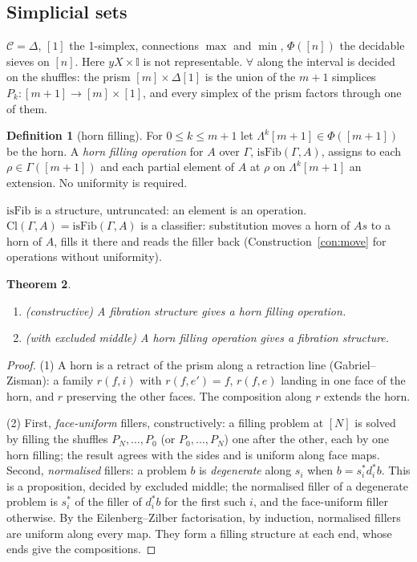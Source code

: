 \documentclass[11pt]{article}
\newcommand{\I}{\mathbb{I}}
\newcommand{\C}{\mathcal{C}}
\newcommand{\Cl}{\mathrm{Cl}}
\newcommand{\isFib}{\mathrm{isFib}}
\newcommand{\Lam}{\Lambda}
\theoremstyle{plain}
\newtheorem{theorem}{Theorem}[section]
\theoremstyle{definition}
\newtheorem{definition}[theorem]{Definition}
\theoremstyle{remark}
\begin{document}
\subsection{Simplicial sets}\label{sec:delta}

$\C=\Delta$, $[1]$ the 1-simplex, connections $\max$ and $\min$, $\Phi([n])$
the decidable sieves on $[n]$. Here $yX\times\I$ is not representable.
$\forall$ along the interval is decided on the shuffles: the prism
$[m]\times\Delta[1]$ is the union of the $m+1$ simplices
$P_k:[m+1]\to[m]\times[1]$, and every simplex of the prism factors
through one of them.

\begin{definition}[horn filling]
For $0\le k\le m+1$ let $\Lam^k[m+1]\in\Phi([m+1])$ be the horn. A
\emph{horn filling operation} for $A$ over $\Gamma$, $\isFib(\Gamma,A)$,
assigns to each $\rho\in\Gamma([m+1])$ and each partial element of $A$ at
$\rho$ on $\Lam^k[m+1]$ an extension. No uniformity is required.
\end{definition}

$\isFib$ is a structure, untruncated: an element is an operation.
$\Cl(\Gamma,A)=\isFib(\Gamma,A)$ is a classifier: substitution moves a
horn of $As$ to a horn of $A$, fills it there and reads the filler back
(Construction~\ref{con:move} for operations without uniformity).

\begin{theorem}\label{thm:hornbox}
\leavevmode
\begin{enumerate}
\item (constructive) A fibration structure gives a horn filling
  operation.
\item (with excluded middle) A horn filling operation gives a fibration
  structure.
\end{enumerate}
\end{theorem}

\begin{proof}
(1) A horn is a retract of the prism along a retraction line
(Gabriel--Zisman): a family $r(f,i)$ with $r(f,e')=f$, $r(f,e)$ landing
in one face of the horn, and $r$ preserving the other faces. The
composition along $r$ extends the horn.

(2) First, \emph{face-uniform} fillers, constructively: a filling problem
at $[N]$ is solved by filling the shuffles $P_N,\ldots,P_0$ (or
$P_0,\ldots,P_N$) one after the other, each by one horn filling; the
result agrees with the sides and is uniform along face maps. Second,
\emph{normalised} fillers: a problem $b$ is \emph{degenerate} along
$s_i$ when $b=s_i^*d_i^*b$. This is a proposition, decided by excluded
middle; the normalised filler of a degenerate problem is
$s_i^*$ of the filler of $d_i^*b$ for the first such $i$, and the
face-uniform filler otherwise. By the Eilenberg--Zilber factorisation,
by induction, normalised fillers are uniform along every map. They form
a filling structure at each end, whose ends give the compositions.
\end{proof}
\end{document}
